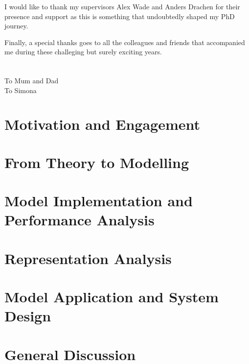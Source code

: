 \documentclass{yorkThesis}
\begin{document}
I would like to thank my supervisors Alex Wade and Anders Drachen for their presence and support as this is something that undoubtedly shaped my PhD journey.

Finally, a special thanks goes to all  the colleagues and friends that accompanied me during these challeging but surely exciting years.


\chapter*{}
\label{dedication}

\begin{flushright}
To Mum and Dad\\
To Simona\\
\end{flushright}


\contents


\mainmatter
\chapter{Motivation and Engagement}
\label{chapter_lit_review}


\chapter{From Theory to Modelling}
\label{chapter_theory_modelling}


\chapter{Model Implementation and Performance Analysis}
\label{chapter_implementation_testing}


\chapter{Representation Analysis}
\label{chapter_repr_anal}


\chapter{Model Application and System Design}
\label{chapter_appliction}


\chapter{General Discussion}
\label{chapter_general_discussion}





\appendix




\end{document}
